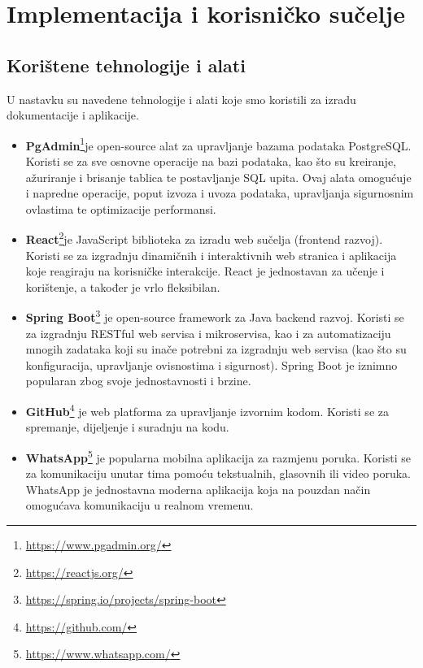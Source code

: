 \chapter{Implementacija i korisničko sučelje}
		
		
		\section{Korištene tehnologije i alati}
			
			U nastavku su navedene tehnologije i alati koje smo koristili za izradu dokumentacije i aplikacije.
			\begin{itemize}
			\item\textbf{PgAdmin}\footnote{\url{https://www.pgadmin.org/}}je open-source alat za upravljanje bazama podataka PostgreSQL. Koristi se za sve osnovne operacije na bazi podataka, kao što su kreiranje, ažuriranje i brisanje tablica te postavljanje SQL upita. Ovaj alata omogućuje i napredne operacije, poput izvoza i uvoza podataka, upravljanja sigurnosnim ovlastima te optimizacije performansi.
			
			\item\textbf{React}\footnote{\url{https://reactjs.org/}}je JavaScript biblioteka za izradu web sučelja (frontend razvoj). Koristi se za izgradnju dinamičnih i interaktivnih web stranica i aplikacija koje reagiraju na korisničke interakcije. React je jednostavan za učenje i korištenje, a također je vrlo fleksibilan.
			
			\item\textbf{Spring Boot}\footnote{\url{https://spring.io/projects/spring-boot}} je open-source framework za Java backend razvoj. Koristi se za izgradnju RESTful web servisa i mikroservisa, kao i za automatizaciju mnogih zadataka koji su inače potrebni za izgradnju web servisa (kao što su konfiguracija, upravljanje ovisnostima i sigurnost). Spring Boot je iznimno popularan zbog svoje jednostavnosti i brzine.
			
			\item\textbf{GitHub}\footnote{\url{https://github.com/}} je web platforma za upravljanje izvornim kodom. Koristi se za spremanje, dijeljenje i suradnju na kodu.
			
			\item\textbf{WhatsApp}\footnote{\url{https://www.whatsapp.com/}} je popularna mobilna aplikacija za razmjenu poruka. Koristi se za komunikaciju unutar tima pomoću tekstualnih, glasovnih ili video poruka. WhatsApp je jednostavna moderna aplikacija koja na pouzdan način omogućava komunikaciju u realnom vremenu.
			

\end{itemize}
